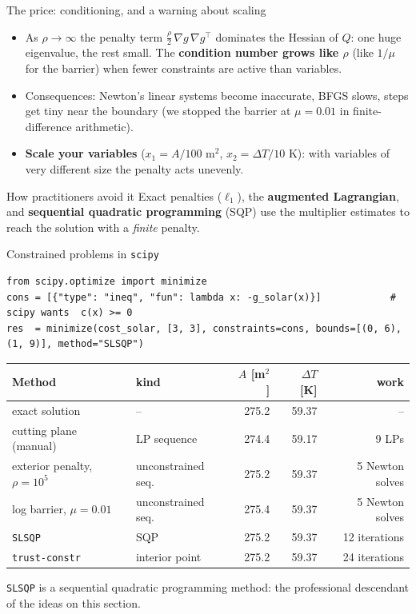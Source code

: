 \documentclass[aspectratio=169,10pt]{beamer}
\newcommand{\grad}{\nabla}
\begin{document}
\begin{frame}{The price: conditioning, and a warning about scaling}
  \begin{itemize}
    \item As $\rho\to\infty$ the penalty term $\frac\rho2\,\grad g\,\grad g^\top$ dominates the Hessian of $Q$: one huge eigenvalue, the rest small. The \textbf{condition number grows like $\rho$} (like $1/\mu$ for the barrier) when fewer constraints are active than variables.
    \item Consequences: Newton's linear systems become inaccurate, BFGS slows, steps get tiny near the boundary (we stopped the barrier at $\mu=0.01$ in finite-difference arithmetic).
    \item \textbf{Scale your variables} ($x_1=A/100$ m$^2$, $x_2=\Delta T/10$ K): with variables of very different size the penalty acts unevenly.
  \end{itemize}
  \begin{alertblock}{How practitioners avoid it}
    Exact penalties ($\ell_1$), the \textbf{augmented Lagrangian}, and \textbf{sequential quadratic programming} (SQP) use the multiplier estimates to reach the solution with a \emph{finite} penalty.
  \end{alertblock}
\end{frame}

\begin{frame}[fragile]{Constrained problems in \texttt{scipy}}
\begin{lstlisting}
from scipy.optimize import minimize
cons = [{"type": "ineq", "fun": lambda x: -g_solar(x)}]            # scipy wants  c(x) >= 0
res  = minimize(cost_solar, [3, 3], constraints=cons, bounds=[(0, 6), (1, 9)], method="SLSQP")
\end{lstlisting}
  \small
  \begin{center}
  \begin{tabular}{llrrr}
    \toprule
    Method & kind & $A$ [m$^2$] & $\Delta T$ [K] & work\\
    \midrule
    exact solution & -- & 275.2 & 59.37 & --\\
    cutting plane (manual) & LP sequence & 274.4 & 59.17 & 9 LPs\\
    exterior penalty, $\rho=10^5$ & unconstrained seq. & 275.2 & 59.37 & 5 Newton solves\\
    log barrier, $\mu=0.01$ & unconstrained seq. & 275.4 & 59.37 & 5 Newton solves\\
    \texttt{SLSQP} & SQP & 275.2 & 59.37 & 12 iterations\\
    \texttt{trust-constr} & interior point & 275.2 & 59.37 & 24 iterations\\
    \bottomrule
  \end{tabular}
  \end{center}
  \texttt{SLSQP} is a sequential quadratic programming method: the professional descendant of the ideas on this section.
\end{frame}
\end{document}
